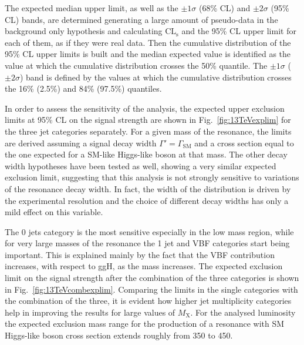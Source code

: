 The expected median upper limit, as well as the $\pm 1\sigma$ (68\% CL) and $\pm 2\sigma$ (95\% CL) bands, are determined generating a large amount of pseudo-data in the background only hypothesis and calculating $\mathrm{CL_s}$ and the 95\% CL upper limit for each of them, as if they were real data. Then the cumulative distribution of the 95\% CL upper limits is built and the median expected value is identified as the value at which the cumulative distribution crosses the 50\% quantile. The $\pm 1\sigma$ ($\pm 2 \sigma$) band is defined by the values at which the cumulative distribution crosses the 16\% (2.5\%) and 84\% (97.5\%) quantiles.

In order to assess the sensitivity of the analysis, the expected upper exclusion limits at 95\% CL on the signal strength are shown in Fig.~\ref{fig:13TeVexplim} for the three jet categories separately. For a given mass of the resonance, the limits are derived assuming a signal decay width $\Gamma' = \Gamma_\mathrm{SM}$ and a cross section equal to the one expected for a SM-like Higgs-like boson at that mass. The other decay width hypotheses have been tested as well, showing a very similar expected exclusion limit, suggesting that this analysis is not strongly sensitive to variations of the resonance decay width. In fact, the width of the \mti distribution is driven by the experimental resolution and the choice of different decay widths has only a mild effect on this variable.

The 0 jets category is the most sensitive especially in the low mass region, while for very large masses of the resonance the 1 jet and VBF categories start being important. This is explained mainly by the fact that the VBF contribution increases, with respect to ggH, as the mass increases. The expected exclusion limit on the signal strength after the combination of the three categories is shown in Fig.~\ref{fig:13TeVcombexplim}. Comparing the limits in the single categories with the combination of the three, it is evident how higher jet multiplicity categories help in improving the results for large values of $M_\mathrm{X}$. For the analysed luminosity the expected exclusion mass range for the production of a resonance with SM Higgs-like boson cross section extends roughly from 350 to 450\GeV.

